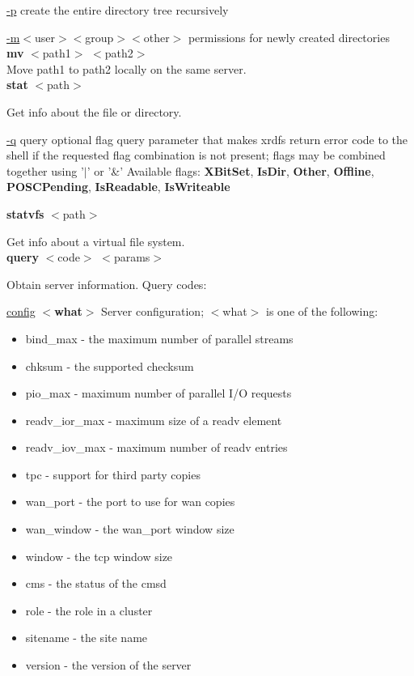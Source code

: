 \documentclass{article}
\begin{document}
        \underline{-p} create the entire directory tree recursively
        
        \underline{-m}$<$user$>$$<$group$>$$<$other$>$ permissions for newly created directories \\

        \noindent \textbf{mv} $<$path1$>$ $<$path2$>$ \\
        Move path1 to path2 locally on the same server. \\

        \noindent \textbf{stat} $<$path$>$
        
        \noindent Get info about the file or directory.

		\begin{minipage}{\dimexpr\textwidth-\parindent}
        \noindent \underline{-q} query optional flag query parameter that makes xrdfs return error code to the shell if the requested flag combination is not present; flags may be combined together using '$\vert$' or '\&'
        Available flags: \textbf{XBitSet}, \textbf{IsDir}, \textbf{Other}, \textbf{Offline}, \textbf{POSCPending}, \textbf{IsReadable}, \textbf{IsWriteable} \\
        \end{minipage}

        \noindent \textbf{statvfs} $<$path$>$
        
        \noindent Get info about a virtual file system. \\

        \noindent \textbf{query} $<$code$>$ $<$params$>$
        
        \noindent Obtain server information. Query codes:
        
        \underline{config} \textbf{$<$what$>$} Server configuration; $<$what$>$ is one of the following:
		\begin{itemize}        
           \item bind_max      - the maximum number of parallel streams
           \item chksum        - the supported checksum
           \item pio_max       - maximum number of parallel I/O requests
           \item readv_ior_max - maximum size of a readv element
           \item readv_iov_max - maximum number of readv entries
           \item tpc           - support for third party copies
           \item wan_port      - the port to use for wan copies
           \item wan_window    - the wan_port window size
           \item window        - the tcp window size
           \item cms           - the status of the cmsd
           \item role          - the role in a cluster
           \item sitename      - the site name
           \item version       - the version of the server
        \end{itemize}      
               
\end{document}
